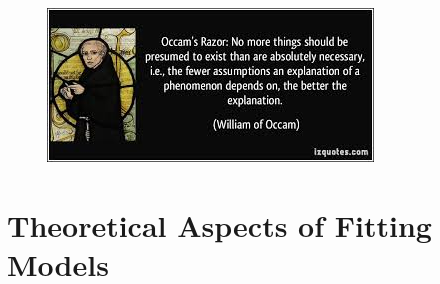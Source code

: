 \documentclass[PredictiveAnalytics101.tex]{subfiles}
\begin{document}
\begin{frame}
	\begin{figure}
\centering
\includegraphics[width=0.99\linewidth]{occamrazor}


\end{figure}

\end{frame}

\section{Theoretical Aspects of Fitting Models}
\end{document}
